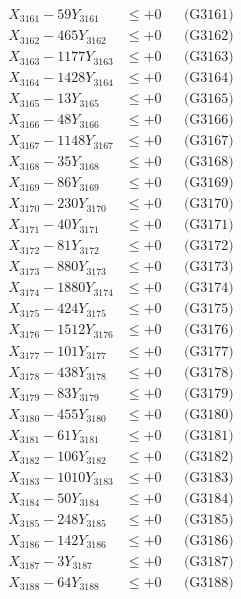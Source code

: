 \documentclass[a4paper,10pt]{article}
\begin{document}
{\begin{align}
\allowbreak
X_{3161} - 59Y_{3161} &\leq +0 && \text{(G3161)} \\
X_{3162} - 465Y_{3162} &\leq +0 && \text{(G3162)} \\
X_{3163} - 1177Y_{3163} &\leq +0 && \text{(G3163)} \\
X_{3164} - 1428Y_{3164} &\leq +0 && \text{(G3164)} \\
X_{3165} - 13Y_{3165} &\leq +0 && \text{(G3165)} \\
X_{3166} - 48Y_{3166} &\leq +0 && \text{(G3166)} \\
X_{3167} - 1148Y_{3167} &\leq +0 && \text{(G3167)} \\
X_{3168} - 35Y_{3168} &\leq +0 && \text{(G3168)} \\
X_{3169} - 86Y_{3169} &\leq +0 && \text{(G3169)} \\
X_{3170} - 230Y_{3170} &\leq +0 && \text{(G3170)} \\
\allowbreak
X_{3171} - 40Y_{3171} &\leq +0 && \text{(G3171)} \\
X_{3172} - 81Y_{3172} &\leq +0 && \text{(G3172)} \\
X_{3173} - 880Y_{3173} &\leq +0 && \text{(G3173)} \\
X_{3174} - 1880Y_{3174} &\leq +0 && \text{(G3174)} \\
X_{3175} - 424Y_{3175} &\leq +0 && \text{(G3175)} \\
X_{3176} - 1512Y_{3176} &\leq +0 && \text{(G3176)} \\
X_{3177} - 101Y_{3177} &\leq +0 && \text{(G3177)} \\
X_{3178} - 438Y_{3178} &\leq +0 && \text{(G3178)} \\
X_{3179} - 83Y_{3179} &\leq +0 && \text{(G3179)} \\
X_{3180} - 455Y_{3180} &\leq +0 && \text{(G3180)} \\
\allowbreak
X_{3181} - 61Y_{3181} &\leq +0 && \text{(G3181)} \\
X_{3182} - 106Y_{3182} &\leq +0 && \text{(G3182)} \\
X_{3183} - 1010Y_{3183} &\leq +0 && \text{(G3183)} \\
X_{3184} - 50Y_{3184} &\leq +0 && \text{(G3184)} \\
X_{3185} - 248Y_{3185} &\leq +0 && \text{(G3185)} \\
X_{3186} - 142Y_{3186} &\leq +0 && \text{(G3186)} \\
X_{3187} - 3Y_{3187} &\leq +0 && \text{(G3187)} \\
X_{3188} - 64Y_{3188} &\leq +0 && \text{(G3188)} \\

\end{align}}
\end{document}
